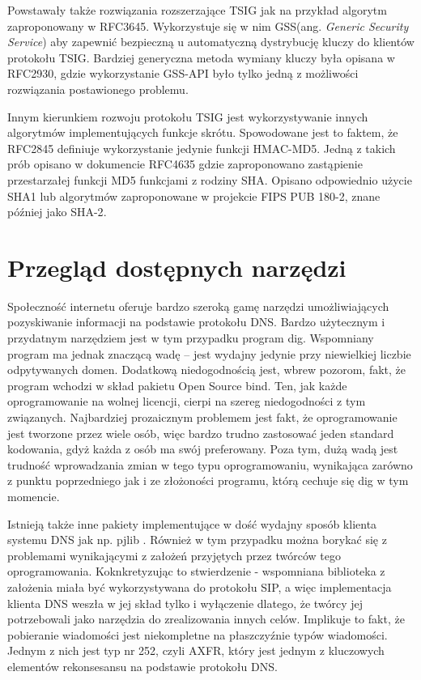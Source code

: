 Powstawały także rozwiązania rozszerzające TSIG jak na przykład algorytm zaproponowany w RFC3645\cite{RFC3645}. Wykorzystuje się w nim GSS\cite{RFC2743}(ang. \textit{Generic Security Service}) aby zapewnić bezpieczną u automatyczną dystrybucję kluczy do klientów protokołu TSIG. Bardziej generyczna metoda wymiany kluczy była opisana w RFC2930\cite{RFC2930}, gdzie wykorzystanie GSS-API było tylko jedną z możliwości rozwiązania postawionego problemu.

Innym kierunkiem rozwoju protokołu TSIG jest wykorzystywanie innych algorytmów implementujących funkcje skrótu. Spowodowane jest to faktem, że RFC2845\cite{RFC2845} definiuje wykorzystanie jedynie funkcji HMAC-MD5. Jedną z takich prób opisano w dokumencie RFC4635\cite{RFC4635} gdzie zaproponowano zastąpienie przestarzałej funkcji MD5 funkcjami z rodziny SHA. Opisano odpowiednio użycie SHA1\cite{RFC3174} lub algorytmów zaproponowane w projekcie FIPS PUB 180-2, znane później jako SHA-2\cite{RFC4634}.

\chapter{Przegląd dostępnych narzędzi}
Społeczność internetu oferuje bardzo szeroką gamę narzędzi umożliwiających pozyskiwanie informacji na podstawie protokołu DNS. Bardzo użytecznym i przydatnym narzędziem jest w tym przypadku program dig. Wspomniany program ma jednak znaczącą wadę -- jest wydajny jedynie przy niewielkiej liczbie odpytywanych domen. Dodatkową niedogodnością jest, wbrew pozorom, fakt, że program wchodzi w skład pakietu Open Source bind. Ten, jak każde oprogramowanie na wolnej licencji, cierpi na szereg niedogodności z tym związanych. Najbardziej prozaicznym problemem jest fakt, że oprogramowanie jest tworzone przez wiele osób, więc bardzo trudno zastosować jeden standard kodowania, gdyż każda z osób ma swój preferowany. Poza tym, dużą wadą jest trudność wprowadzania zmian w tego typu oprogramowaniu, wynikająca zarówno z punktu poprzedniego jak i ze złożoności programu, którą cechuje się dig w tym momencie.

Istnieją także inne pakiety implementujące w dość wydajny sposób klienta systemu DNS jak np. pjlib \cite{pjlib}. Również w tym przypadku można borykać się z problemami wynikającymi z założeń przyjętych przez twórców tego oprogramowania. Koknkretyzując to stwierdzenie - wspomniana biblioteka z założenia miała być wykorzystywana do protokołu SIP, a więc implementacja klienta DNS weszła w jej skład tylko i wyłączenie dlatego, że twórcy jej potrzebowali jako narzędzia do zrealizowania innych celów. Implikuje to fakt, że pobieranie wiadomości jest niekompletne na płaszczyźnie typów wiadomości. Jednym z nich jest typ nr 252, czyli AXFR, który jest jednym z kluczowych elementów rekonsesansu na podstawie protokołu DNS.